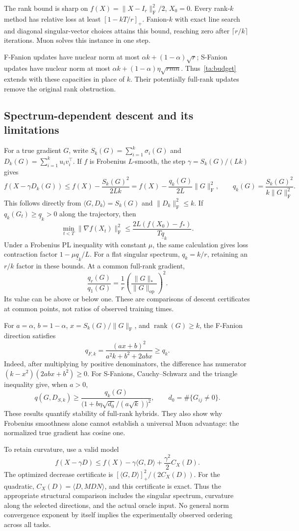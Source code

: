 The rank bound is sharp on $f(X)=\|X-I_r\|_{\mathrm F}^2/2$, $X_0=0$.
Every rank-$k$ method has relative loss at least
$[1-kT/r]_+$. Fanion-$k$ with exact line search and diagonal singular-vector
choices attains this bound, reaching zero after $\lceil r/k\rceil$
iterations. Muon solves this instance in one step.

F-Fanion updates have nuclear norm at most
$\alpha k+(1-\alpha)\sqrt r$; S-Fanion updates have nuclear norm at most
$\alpha k+(1-\alpha)\eta\sqrt{r mn}$. Thus~\eqref{ta:budget} extends with
these capacities in place of $k$. Their potentially full-rank updates
remove the original rank obstruction.

\subsection{Spectrum-dependent descent and its limitations}

For a true gradient $G$, write $S_k(G)=\sum_{i=1}^k\sigma_i(G)$ and
$D_k(G)=\sum_{i=1}^k u_i v_i^\top$. If $f$ is Frobenius $L$-smooth,
the step $\gamma=S_k(G)/(Lk)$ gives
\[
 f(X-\gamma D_k(G))\leq f(X)
 -\frac{S_k(G)^2}{2Lk}
 =f(X)-\frac{q_k(G)}{2L}\|G\|_{\mathrm F}^2,
 \qquad
 q_k(G)=\frac{S_k(G)^2}{k\|G\|_{\mathrm F}^2}.
\]
This follows directly from $\langle G,D_k\rangle=S_k(G)$ and
$\|D_k\|_{\mathrm F}^2\leq k$.
If $q_k(G_t)\geq\underline q_k>0$ along the trajectory, then
\[
 \min_{t<T}\|\nabla f(X_t)\|_{\mathrm F}^2
 \leq\frac{2L(f(X_0)-f_*)}{T\underline q_k}.
\]
Under a Frobenius PL inequality with constant $\mu$, the same calculation
gives loss contraction factor $1-\mu\underline q_k/L$.
For a flat singular spectrum, $q_k=k/r$, retaining an $r/k$ factor in
these bounds. At a common full-rank gradient,
\[
 \frac{q_r(G)}{q_1(G)}=
 \frac1r\left(\frac{\|G\|_*}{\|G\|_{\mathrm{op}}}\right)^2.
\]
Its value can be above or below one. These are comparisons of descent
certificates at common points, not ratios of observed training times.

For $a=\alpha$, $b=1-\alpha$, $x=S_k(G)/\|G\|_{\mathrm F}$, and
$\operatorname{rank}(G)\geq k$, the F-Fanion direction satisfies
\[
 q_{F,k}=\frac{(ax+b)^2}{a^2k+b^2+2abx}\geq q_k.
\]
Indeed, after multiplying by positive denominators, the difference has
numerator $(k-x^2)(2abx+b^2)\geq0$. For S-Fanions, Cauchy--Schwarz and
the triangle inequality give, when $a>0$,
\[
 q(G,D_{S,k})\geq
 \frac{q_k(G)}{\bigl(1+b\eta\sqrt{d_0}/(a\sqrt k)\bigr)^2},
 \qquad d_0=\#\{G_{ij}\ne0\}.
\]
These results quantify stability of full-rank hybrids. They also show why
Frobenius smoothness alone cannot establish a universal Muon advantage:
the normalized true gradient has cosine one.

To retain curvature, use a valid model
\[
 f(X-\gamma D)\leq f(X)-\gamma\langle G,D\rangle
 +\frac{\gamma^2}{2}C_X(D).
\]
The optimized decrease certificate is
$[\langle G,D\rangle]_+^2/(2C_X(D))$. For the quadratic,
$C_X(D)=\langle D,MDN\rangle$, and this certificate is exact.
Thus the appropriate structural comparison includes the singular spectrum,
curvature along the selected directions, and the actual oracle input.
No general norm convergence exponent by itself implies the experimentally
observed ordering across all tasks.
